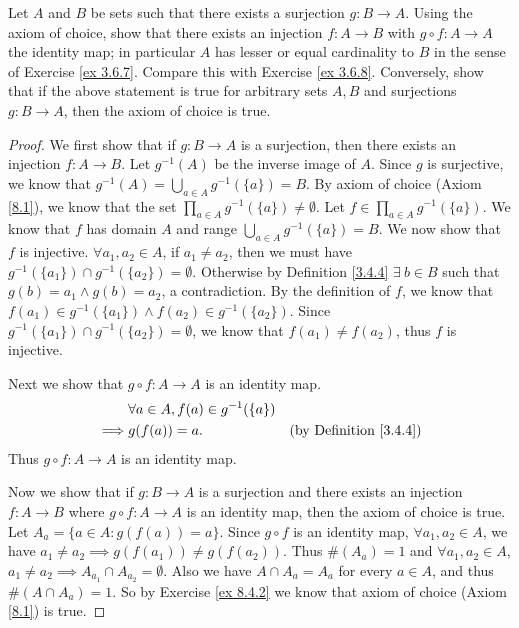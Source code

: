 \begin{exercise}\label{ex 8.4.3}
    Let \(A\) and \(B\) be sets such that there exists a surjection \(g : B \to A\).
    Using the axiom of choice, show that there exists an injection \(f: A \to B\) with \(g \circ f : A \to A\) the identity map;
    in particular \(A\) has lesser or equal cardinality to \(B\) in the sense of Exercise \ref{ex 3.6.7}.
    Compare this with Exercise \ref{ex 3.6.8}.
    Conversely, show that if the above statement is true for arbitrary sets \(A, B\) and surjections \(g : B \to A\), then the axiom of choice is true.
\end{exercise}

\begin{proof}
    We first show that if \(g : B \to A\) is a surjection, then there exists an injection \(f : A \to B\).
    Let \(g^{-1}(A)\) be the inverse image of \(A\).
    Since \(g\) is surjective, we know that \(g^{-1}(A) = \bigcup_{a \in A} g^{-1}(\{a\}) = B\).
    By axiom of choice (Axiom \ref{8.1}), we know that the set \(\prod_{a \in A} g^{-1}(\{a\}) \neq \emptyset\).
    Let \(f \in \prod_{a \in A} g^{-1}(\{a\})\).
    We know that \(f\) has domain \(A\) and range \(\bigcup_{a \in A} g^{-1}(\{a\}) = B\).
    We now show that \(f\) is injective.
    \(\forall a_1, a_2 \in A\), if \(a_1 \neq a_2\), then we must have \(g^{-1}(\{a_1\}) \cap g^{-1}(\{a_2\}) = \emptyset\).
    Otherwise by Definition \ref{3.4.4} \(\exists\ b \in B\) such that \(g(b) = a_1 \land g(b) = a_2\), a contradiction.
    By the definition of \(f\), we know that \(f(a_1) \in g^{-1}(\{a_1\}) \land f(a_2) \in g^{-1}(\{a_2\})\).
    Since \(g^{-1}(\{a_1\}) \cap g^{-1}(\{a_2\}) = \emptyset\), we know that \(f(a_1) \neq f(a_2)\), thus \(f\) is injective.

    Next we show that \(g \circ f : A \to A\) is an identity map.
    \begin{align*}
                 & \forall a \in A, f(a) \in g^{-1}(\{a\})                                      \\
        \implies & g(f(a)) = a.                            & \text{(by Definition \ref{3.4.4})}
    \end{align*}
    Thus \(g \circ f : A \to A\) is an identity map.

    Now we show that if \(g : B \to A\) is a surjection and there exists an injection \(f : A \to B\) where \(g \circ f : A \to A\) is an identity map, then the axiom of choice is true.
    Let \(A_a = \{a \in A : g(f(a)) = a\}\).
    Since \(g \circ f\) is an identity map, \(\forall a_1, a_2 \in A\), we have \(a_1 \neq a_2 \implies g(f(a_1)) \neq g(f(a_2))\).
    Thus \(\#(A_a) = 1\) and \(\forall a_1, a_2 \in A\), \(a_1 \neq a_2 \implies A_{a_1} \cap A_{a_2} = \emptyset\).
    Also we have \(A \cap A_a = A_a\) for every \(a \in A\), and thus \(\#(A \cap A_a) = 1\).
    So by Exercise \ref{ex 8.4.2} we know that axiom of choice (Axiom \ref{8.1}) is true.
\end{proof}